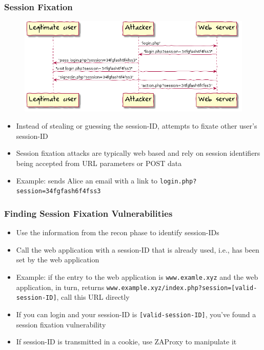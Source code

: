 \begin{frame}
    \frametitle{Session Fixation}
    \begin{figure}[htb]
        \centering
        \includegraphics[scale=.5]{uml/session-fixation.png}
    \end{figure}
    \begin{itemize}
        \item Instead of stealing or guessing the session-ID, \attacker attempts to fixate other user's session-ID
        \item Session fixation attacks are typically web based and rely on session identifiers being accepted from URL parameters or POST data
        \item Example: \attacker sends Alice an email with a link to \texttt{login.php?session=34fgfash6f4fss3}
    \end{itemize}
\end{frame}

\begin{frame}
    \frametitle{Finding Session Fixation Vulnerabilities}
    \begin{itemize}
        \item Use the information from the recon phase to identify session-IDs
        \item Call the web application with a session-ID that is already used, i.e., has been set by the web application
        \item Example: if the entry to the web application is \texttt{www.examle.xyz} and the web application, in turn, returns \texttt{www.example.xyz/index.php?session=[valid-session-ID]}, call this URL directly
        \item If you can login and your session-ID is \texttt{[valid-session-ID]}, you've found a session fixation vulnerability
        \item If session-ID is transmitted in a cookie, use ZAProxy to manipulate it   
    \end{itemize}
\end{frame}

